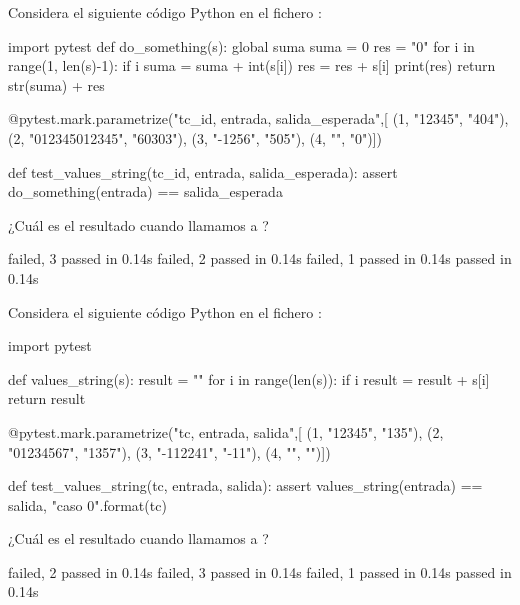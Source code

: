 \begin{ejercicio} Considera el siguiente código Python en el fichero 
:

\begin{python}
import pytest
def do_something(s):
  global suma
  suma = 0
  res = "0"
  for i in range(1, len(s)-1):
    if i %
      suma = suma + int(s[i])
      res = res + s[i]
      print(res)
  return str(suma) + res

@pytest.mark.parametrize("tc_id, entrada, salida_esperada",[
(1, "12345", "404"),
(2, "012345012345", "60303"),
(3, "-1256", "505"),
(4, "", "0")])

def test_values_string(tc_id, entrada, salida_esperada):
    assert do_something(entrada) == salida_esperada
\end{python}

¿Cuál es el resultado cuando llamamos a ?

\begin{choices}
     failed, 3 passed in 0.14s   %
     failed, 2 passed in 0.14s
     failed, 1 passed in 0.14s
     passed in 0.14s
\end{choices}

\end{ejercicio}

\begin{ejercicio} Considera el siguiente código Python en el fichero 
:

\begin{python}
import pytest

def values_string(s):
  result = "" 
  for i in range(len(s)):
    if i %
      result = result + s[i]
  return result

@pytest.mark.parametrize("tc, entrada, salida",[
(1, "12345", "135"),
(2, "01234567", "1357"),
(3, "-112241", "-11"),
(4, "", "")])

def test_values_string(tc, entrada, salida):
    assert values_string(entrada) == salida, "caso {0}".format(tc)
\end{python}

¿Cuál es el resultado cuando llamamos a ?

\begin{choices}
     failed, 2 passed in 0.14s %
     failed, 3 passed in 0.14s
     failed, 1 passed in 0.14s
     passed in 0.14s
\end{choices}


\end{ejercicio}


